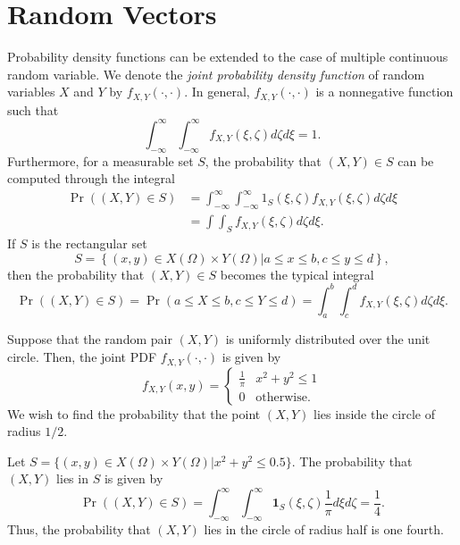 \chapter{Random Vectors}

Probability density functions can be extended to the case of multiple continuous random variable.
We denote the \emph{joint probability density function} of random variables $X$ and $Y$ by $f_{X,Y} (\cdot, \cdot)$. 
In general, $f_{X,Y} (\cdot, \cdot)$ is a nonnegative function such that
\begin{equation*}
\int_{-\infty}^{\infty} \int_{-\infty}^{\infty}
f_{X, Y} (\xi, \zeta) d\zeta d\xi = 1.
\end{equation*}
Furthermore, for a measurable set $S$, the probability that $(X,Y) \in S$ can be computed through the integral
\begin{equation*}
\begin{split}
\Pr ((X,Y) \in S)
&= \int_{-\infty}^{\infty} \int_{-\infty}^{\infty}
\mathrm{1}_{S}(\xi, \zeta) f_{X, Y} (\xi, \zeta) d\zeta d\xi \\
&= \int \int_{S}
f_{X, Y} (\xi, \zeta) d\zeta d\xi .
\end{split}
\end{equation*}
If $S$ is the rectangular set
\begin{equation*}
S = \left\{ (x,y) \in X(\Omega) \times Y(\Omega) \big| a \leq x \leq b, c \leq y \leq d \right\} ,
\end{equation*}
then the probability that $(X,Y) \in S$ becomes the typical integral
\begin{equation*}
\Pr ((X,Y) \in S)
= \Pr (a \leq X \leq b, c \leq Y \leq d)
= \int_{a}^{b} \int_{c}^{d}
f_{X, Y} (\xi, \zeta) d\zeta d\xi .
\end{equation*}

\begin{example}
Suppose that the random pair $(X, Y)$ is uniformly distributed over the unit circle.
Then, the joint PDF $f_{X,Y} (\cdot, \cdot)$ is given by
\begin{equation*}
f_{X,Y} (x, y) = \begin{cases} \frac{1}{\pi} & x^2 + y^2 \leq 1 \\
0 & \text{otherwise} . \end{cases}
\end{equation*}
We wish to find the probability that the point $(X, Y)$ lies inside the circle of radius $1/2$.

Let $S = \{ (x, y) \in X(\Omega) \times Y(\Omega) | x^2 + y^2 \leq 0.5 \}$.
The probability that $(X, Y)$ lies in $S$ is given by
\begin{equation*}
\Pr ((X,Y) \in S)
= \int_{-\infty}^{\infty} \int_{-\infty}^{\infty}
\mathbf{1}_{S}(\xi, \zeta) \frac{1}{\pi} d\xi d\zeta
= \frac{1}{4} .
\end{equation*}
Thus, the probability that $(X,Y)$ lies in the circle of radius half is one fourth.
\end{example}

